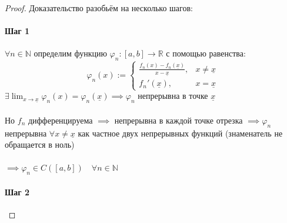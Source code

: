 \documentclass[11pt]{article}
\begin{document}
\begin{proof}
    Доказательство разобьём на несколько шагов:

    \paragraph{Шаг 1}

    $\forall n \in \mathbb{N}$ определим функцию $\varphi_n \colon [a, b] 
    \to \mathbb{R}$ с помощью равенства:
    \[\varphi_n(x) := 
    \begin{cases}
        \displaystyle \frac{f_n(x) - f_n(\underline{x})}{x - \underline{x}}, 
        & x \neq \underline{x} \\
        f_n'(\underline{x}), & x = \underline{x}
    \end{cases}\]
    $\exists \displaystyle \lim_{x \to \underline{x}} \varphi_n(x) = 
    \varphi_n(\underline{x}) \implies \varphi_n$ непрерывна в точке 
    $\underline{x}$ \\ \\
    Но $f_n$ дифференцируема $\implies$ непрерывна в каждой точке отрезка 
    $\implies \varphi_n$ непрерывна $\forall x \neq \underline{x}$ как 
    частное двух непрерывных функций (знаменатель не обращается в ноль) \\ \\
    $\implies \varphi_n \in C([a, b]) \quad \forall n \in \mathbb{N}$

    \paragraph{Шаг 2}


\end{proof}
\end{document}

